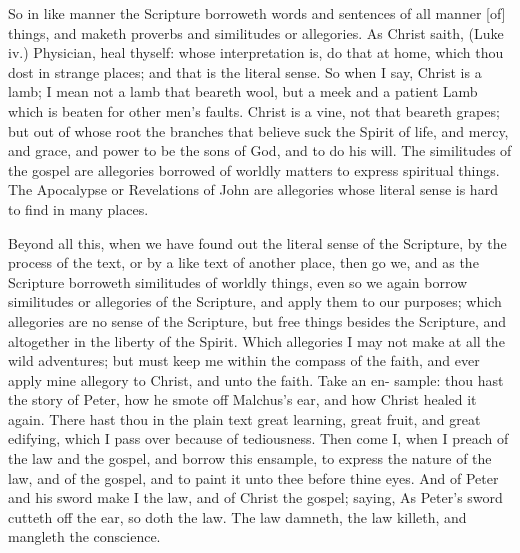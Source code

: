 \documentclass{custom}
\begin{document}
So in like manner the Scripture borroweth words and 
sentences of all manner [of] things, and maketh proverbs 
and similitudes or allegories. As Christ saith, (Luke iv.) 
Physician, heal thyself: whose interpretation is, do that at 
home, which thou dost in strange places; and that is the 
literal sense. So when I say, Christ is a lamb; I mean 
not a lamb that beareth wool, but a meek and a patient 
Lamb which is beaten for other men's faults. Christ is a 
vine, not that beareth grapes; but out of whose root the 
branches that believe suck the Spirit of life, and mercy, 
and grace, and power to be the sons of God, and to do 
his will. The similitudes of the gospel are allegories
borrowed of worldly matters to express spiritual things.
The Apocalypse or Revelations of John are allegories 
whose literal sense is hard to find in many places. 

Beyond all this, when we have found out the literal sense 
of the Scripture, by the process of the text, or by a like 
text of another place, then go we, and as the Scripture 
borroweth similitudes of worldly things, even so we again 
borrow similitudes or allegories of the Scripture, and apply 
them to our purposes; which allegories are no sense of
the Scripture, but free things besides the Scripture, and
altogether in the liberty of the Spirit. Which allegories
I may not make at all the wild adventures; but must 
keep me within the compass of the faith, and ever apply 
mine allegory to Christ, and unto the faith. Take an en- 
sample: thou hast the story of Peter, how he smote off 
Malchus's ear, and how Christ healed it again. There 
hast thou in the plain text great learning, great fruit, and 
great edifying, which I pass over because of tediousness. 
Then come I, when I preach of the law and the gospel, 
and borrow this ensample, to express the nature of the 
law, and of the gospel, and to paint it unto thee before 
thine eyes. And of Peter and his sword make I the law, 
and of Christ the gospel; saying, As Peter's sword cutteth 
off the ear, so doth the law. The law damneth, the law 
killeth, and mangleth the conscience. 
\end{document}
